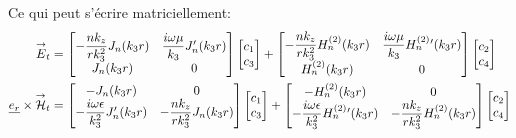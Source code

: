     Ce qui peut s'écrire matriciellement:
    \begin{align}
        {\overset{\rightarrow}{E}}_t &= 
        \begin{bmatrix}
            -\dfrac{nk_z}{rk_3^2}J_n(k_3r) & \dfrac{i\omega\mu}{k_3}J_n'(k_3r)
            \\
            J_n(k_3r) & 0
        \end{bmatrix}
        \begin{bmatrix}
            c_1 \\
            c_3
        \end{bmatrix}
        +
        \begin{bmatrix}
            -\dfrac{nk_z}{rk_3^2}H_n^{(2)}(k_3r) & \dfrac{i\omega\mu}{k_3}H_n^{(2)}{}'(k_3r)
            \\
            H_n^{(2)}(k_3r) & 0
        \end{bmatrix}
        \begin{bmatrix}
            c_2 \\
            c_4
        \end{bmatrix}
        \\
        \underline{e_r}\times{\overset{\rightarrow}{\mathcal{H}}}_t &= 
        \begin{bmatrix}
            -J_n(k_3r) & 0
            \\
            -\dfrac{i\omega\epsilon}{k_3^2}J_n'(k_3r) & -\dfrac{nk_z}{rk_3^2}J_n(k_3r)
        \end{bmatrix}
        \begin{bmatrix}
            c_1 \\
            c_3
        \end{bmatrix}
        +
        \begin{bmatrix}
            -H_n^{(2)}(k_3r) & 0
            \\
            -\dfrac{i\omega\epsilon}{k_3^2}H_n^{(2)}{}'(k_3r) & -\dfrac{nk_z}{rk_3^2}H_n^{(2)}(k_3r)
        \end{bmatrix}
        \begin{bmatrix}
            c_2 \\
            c_4
        \end{bmatrix}
    \end{align}

    \newcommand{\mJ}{\mat{J}}
    \newcommand{\mH}{\mat{H}}

